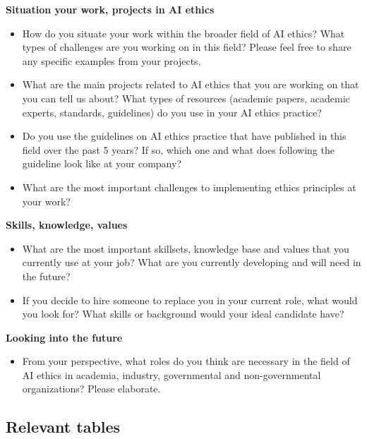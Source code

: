 \textbf{ 
Situation your work, projects in AI ethics 
}
\begin{itemize}
    \item How do you situate your work within the broader field of AI ethics? What types of challenges are you working on in this field? Please feel free to share any specific examples from your projects.
\item What are the main projects related to AI ethics that you are working on that you can tell us about?
What types of resources (academic papers, academic experts, standards, guidelines) do you use in your AI ethics practice?
\item Do you use the guidelines on AI ethics practice that have published in this field over the past 5 years? If so, which one and what does following the guideline look like at your company? 
\item What are the most important challenges to implementing ethics principles at your work?

\end{itemize}

\textbf{Skills, knowledge, values 
}
\begin{itemize}
    \item What are the most important skillsets, knowledge base and values that you currently use at your job? What are you currently developing and will need in the future? 

\item If you decide to hire someone to replace you in your current role, what would you look for? What skills or background would your ideal candidate have? 

\end{itemize}

\textbf{Looking into the future
}
\begin{itemize}
    \item From your perspective, what roles do you think are necessary in the field of AI ethics in academia, industry, governmental and non-governmental organizations? Please elaborate. 

\end{itemize}
\newpage
\subsection{Relevant tables}


